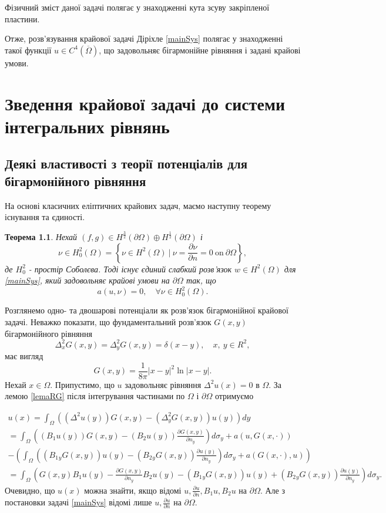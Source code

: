 \documentclass[12pt]{report}
\newtheorem{theorem}{Теорема}
\begin{document}
Фізичний зміст даної задачі полягає у знаходженні кута зсуву закріпленої пластини.

Отже, розв'язування крайової задачі Діріхле \eqref{mainSys} полягає у знаходженні такої функції $u\in C^4(\overline{\Omega})$, що задовольняє бігармонійне рівняння і задані крайові умови.

\newpage


 \setcounter{secnumdepth}{1}
 \chapter{Зведення крайової задачі до системи інтегральних рівнянь}
 \section{Деякі властивості з теорії потенціалів для бігармонійного рівняння}
 
 На основі класичних еліптичних крайових задач, маємо наступну теорему існування та єдиності.
 
 \begin{theorem}
 	Нехай $(f, g)\in H^\frac{3}{2}(\partial\Omega)\oplus H^\frac{1}{2}(\partial\Omega)$ і 
 	$$
 		\nu\in H_0^2(\Omega)=\left\{\nu\in H^2(\Omega)\ | \ \nu=\frac{\partial\nu}{\partial n}=0 \ \textrm{on} \ \partial\Omega \right\},
	$$
	де $H_0^2$ - простір Соболєва. Тоді існує єдиний слабкий розв'язок $w \in H^2(\Omega)$ для \eqref{mainSys}, який задовольняє крайові умови на $\partial\Omega$ так, що
 	$$
 		a( u, \nu)=0, \quad \forall \nu\in H_0^2(\Omega).
	$$
 \end{theorem}
 
 Розглянемо одно- та двошарові потенціали як розв'язок бігармонійної крайової задачі. Неважко показати, що фундаментальний розв'язок $G(x, y)$ бігармонійного рівняння
 $$
 	\Delta_x^2 G(x, y)=\Delta_y^2 G(x, y)=\delta(x-y), \quad x,\ y \in R^2,
$$
 має вигляд
 \begin{equation}
 	G(x, y)=\frac{1}{8\pi}|x-y|^2\ln|x-y|.
 \end{equation}
 Нехай $x \in \Omega$. Припустимо, що $ u$ задовольняє рівняння $\Delta^2 u(x)=0$ в $\Omega$. За лемою \eqref{lemaRG} після інтегрування частинами по $\Omega$ і $\partial\Omega$ отримуємо

  \begin{gather*}
  	 u(x)=\int_\Omega((\Delta^2 u(y))G(x,y)-(\Delta_y^2 G(x, y)) u(y))dy \\
 	 =\int_\Omega((B_1 u(y))G(x,y)-(B_2 u(y))\frac{\partial G(x,y)}{\partial n_y})d\sigma_y+a( u,G(x,\cdot)) \\
 	 -(\int_\Omega((B_1{_y}G(x,y)) u(y)-(B_2{_y}G(x,y))\frac{\partial  u(y)}{\partial n_y})d\sigma_y+a(G(x,\cdot), u)) \\
 	 =\int_\Omega(G(x,y)B_1 u(y)-\frac{\partial G(x,y)}{\partial n_y}B_2 u(y) - (B_1{_y}G(x,y)) u(y)+(B_2{_y}G(x,y))\frac{\partial  u(y)}{\partial n_y})d\sigma_y.
  \end{gather*}
Очевидно, що $ u(x)$ можна знайти, якщо відомі $ u, \frac{\partial u}{\partial n}, B_1 u, B_2 u$ на $\partial\Omega$. Але з постановки задачі \eqref{mainSys} відомі лише $ u, \frac{\partial u}{\partial n}$ на $\partial\Omega$. 
\end{document}
